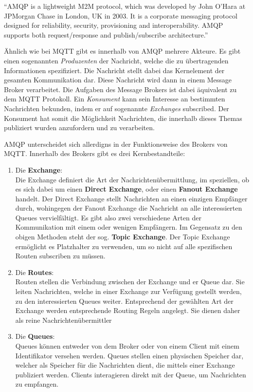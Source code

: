 \begin{definition}
    \enquote{\ac{AMQP} is a lightweight M2M protocol, which was developed by John O’Hara at JPMorgan Chase in London, UK in 2003. It is a corporate messaging protocol designed for reliability, security, provisioning and interoperability. AMQP supports both request/response and publish/subscribe architecture.}\autocite{naik2017choice}
\end{definition}

Ähnlich wie bei \ac{MQTT} gibt es innerhalb von \ac{AMQP} mehrere Akteure. Es gibt einen sogenannten \textit{Produzenten} der Nachricht, welche die zu übertragenden Informationen spezifiziert. Die Nachricht stellt dabei das Kernelement der gesamten Kommunikation dar. Diese Nachricht wird dann in einem Message Broker verarbeitet. Die Aufgaben des Message Brokers ist dabei äquivalent zu dem \ac{MQTT} Protokoll. Ein \textit{Konsument} kann sein Interesse an bestimmten Nachrichten bekunden, indem er auf sogenannte \textit{Exchanges} subscribed. Der Konsument hat somit die Möglichkeit Nachrichten, die innerhalb dieses Themas publiziert wurden anzufordern und zu verarbeiten.

\ac{AMQP} unterscheidet sich allerdigns in der Funktionsweise des Brokers von \ac{MQTT}. Innerhalb des Brokers gibt es drei Kernbestandteile:
\begin{enumerate}
    \item Die \textbf{Exchange}:\\
    Die Exchange definiert die Art der Nachrichtenübermittlung, im speziellen, ob es sich dabei um einen \textbf{Direct Exchange}, oder einen \textbf{Fanout Exchange} handelt. Der Direct Exchange stellt Nachrichten an einen einzigen Empfänger durch, wohingegen der Fanout Exchange die Nachricht an alle interessierten Queues vervielfältigt. Es gibt also zwei verschiedene Arten der Kommunikation mit einem oder wenigen Empfängern. Im Gegensatz zu den obigen Methoden steht der sog. \textbf{Topic Exchange}. Der Topic Exchange ermöglicht es Platzhalter zu verwenden, um so nicht auf alle spezifischen Routen subscriben zu müssen.
    \item Die \textbf{Routes}:\\
    Routen stellen die Verbindung zwischen der Exchange und er Queue dar. Sie leiten Nachrichten, welche in einer Exchange zur Verfügung gestellt werden, zu den interessierten Queues weiter. Entsprechend der gewählten Art der Exchange werden entsprechende Routing Regeln angelegt. Sie dienen daher als reine Nachrichtenübermittler
    \item Die \textbf{Queues}:\\
    Queues können entweder von dem Broker oder von einem Client mit einem Identifikator versehen werden. Queues stellen einen physischen Speicher dar, welcher als Speicher für die Nachrichten dient, die mittels einer Exchange publiziert werden. Clients interagieren direkt mit der Queue, um Nachrichten zu empfangen.
\end{enumerate}

